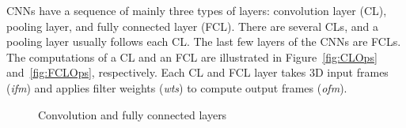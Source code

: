 \documentclass[a4paper,10pt]{article}
\begin{document}
CNNs have a sequence of mainly three types of layers: convolution layer (CL), pooling layer, and fully connected layer (FCL). There are several CLs, and a pooling layer usually follows each CL. The last few layers of the CNNs are FCLs. The computations of a CL and an FCL are illustrated in Figure~\ref{fig:CLOps} and~\ref{fig:FCLOps}, respectively. Each CL and FCL layer takes 3D input frames (\textit{ifm}) and applies filter weights (\textit{wts}) to compute output frames (\textit{ofm}).   
\begin{figure}[!htb]
	\centering
    \captionsetup{font=sf}	
	\hfil	
	\hfil	
	\caption{Convolution and fully connected layers}
	\label{fig:CNNAcceleratorAndCLOps}
\end{figure}
\end{document}
